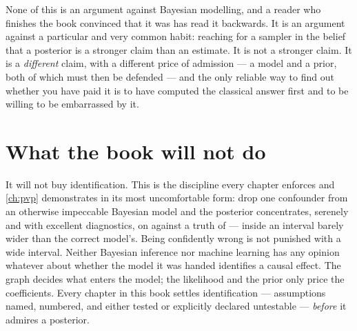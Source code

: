 None of this is an argument against Bayesian modelling, and a reader who finishes the book
convinced that it was has read it backwards. It is an argument against a particular and very
common habit: reaching for a sampler in the belief that a posterior is a stronger claim than an
estimate. It is not a stronger claim. It is a \emph{different} claim, with a different price of
admission --- a model and a prior, both of which must then be defended --- and the only reliable
way to find out whether you have paid it is to have computed the classical answer first and to be
willing to be embarrassed by it.

\section*{What the book will not do}

It will not buy identification. This is the discipline every chapter enforces and
\cref{ch:pvp} demonstrates in its most uncomfortable form: drop one confounder from an otherwise
impeccable Bayesian model and the posterior concentrates, serenely and with excellent
diagnostics, on \eur{\nbZeroNoadjMean} against a truth of \eur{\nbZeroTrueDag} --- inside an
interval barely wider than the correct model's. Being confidently wrong is not punished with a
wide interval. Neither Bayesian inference nor machine learning has any opinion whatever about
whether the model it was handed identifies a causal effect. The graph decides what enters the
model; the likelihood and the prior only price the coefficients. Every chapter in this book
settles identification --- assumptions named, numbered, and either tested or explicitly declared
untestable --- \emph{before} it admires a posterior.
